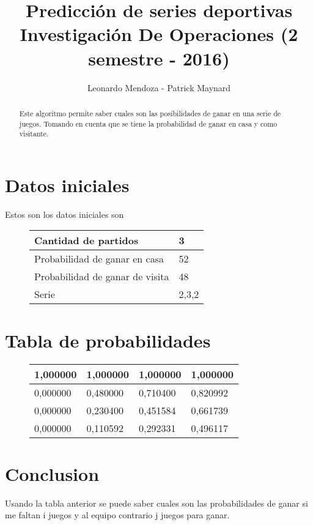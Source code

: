 \documentclass{article}
\begin{document}
\title{Predicción de series deportivas Investigación De Operaciones  (2 semestre - 2016)}
\author{Leonardo Mendoza - Patrick Maynard}

\maketitle

\begin{abstract}
Este algoritmo permite saber cuales son las posibilidades de ganar en una serie de juegos. Tomando en cuenta que se tiene la probabilidad de ganar en casa y como visitante. 
\end{abstract}

\section{Datos iniciales}

Estos son los datos iniciales son

\centering 
\begin{figure}[H]
\label{my-label2}
\begin{tabular}{|l|l|} 
\hline
 Cantidad de partidos & 3 \\ \hline
 Probabilidad de ganar en casa & 52 \\ \hline
 Probabilidad de ganar de visita & 48 \\ \hline
 Serie & 2,3,2 \\ \hline

\end{tabular}
\end{figure}
    
\section{Tabla de probabilidades}


\centering 
\begin{figure}[H]
\label{my-label2}
\begin{tabular}{|l|l|l|l|}
\hline
 1,000000& 1,000000& 1,000000& 1,000000\\ \hline
0,000000& 0,480000& 0,710400& 0,820992\\ \hline
0,000000& 0,230400& 0,451584& 0,661739\\ \hline
0,000000& 0,110592& 0,292331& 0,496117\\ \hline
\end{tabular}
\end{figure}


\section{Conclusion}
Usando la tabla anterior se puede saber cuales son las probabilidades de ganar si me faltan i juegos y al equipo contrario j juegos para ganar. 
\end{document}
